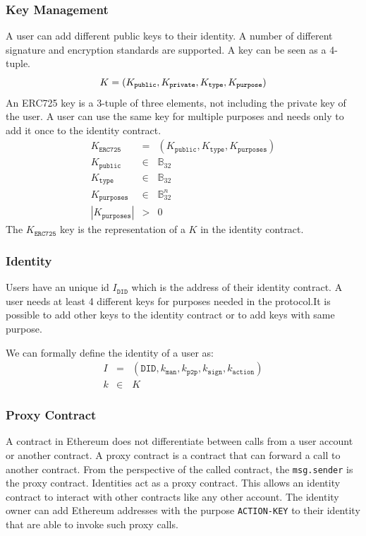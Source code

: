 \subsubsection{Key Management}
A user can add different public keys to their identity. A number of different signature and encryption standards are supported. A key can be seen as a 4-tuple.
\begin{equation}
K = (K_\mathtt{public},K_\mathtt{private},K_\mathtt{type},K_\mathtt{purpose})\\
\end{equation}
An ERC725 key is a 3-tuple of three elements, not including the private key of the user. A user can use the same key for multiple purposes and needs only to add it once to the identity contract.
\begin{eqnarray}
K_\mathtt{ERC725} & = & (K_\mathtt{public},K_\mathtt{type},K_\mathtt{purposes})\\
K_\mathtt{public} & \in & \mathbb{B}_{32} \\
K_\mathtt{type} & \in & \mathbb{B}_{32} \\
 K_\mathtt{purposes} &\in & \mathbb{B}_{32}^n \\
  |K_\mathtt{purposes}| & >  & 0
\end{eqnarray}
The $K_\texttt{ERC725}$ key is the representation of a $K$ in the identity contract. 
\subsubsection{Identity}
Users have an unique id $I_\mathtt{DID}$ which is the address of their identity contract. A user needs at least 4 different keys for purposes needed in the protocol.It is possible to add other keys to the identity contract or to add keys with same purpose. 

We can formally define the identity of a user as:
\begin{eqnarray}
    I& = &(\mathtt{DID},k_\mathtt{man},k_\mathtt{p2p},k_\mathtt{sign},k_\mathtt{action}) \\
    k & \in & K
\end{eqnarray}


\subsubsection{Proxy Contract}
A contract in Ethereum does not differentiate between calls from a user account or another contract. A proxy contract is a contract that can forward a call to another contract. From the perspective of the called contract, the \texttt{msg.sender} is the proxy contract. Identities act as a proxy contract. This allows an identity contract to interact with other contracts like any other account. The identity owner can add Ethereum addresses with the purpose \texttt{ACTION-KEY} to their identity that are able to invoke such proxy calls. 

